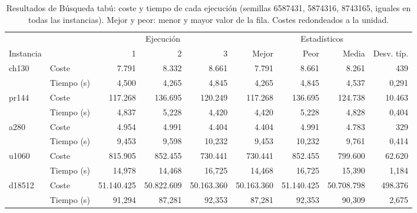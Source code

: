 \begin{table}[H]
\centering\small\setlength{\tabcolsep}{4pt}\renewcommand{\arraystretch}{1.15}
\begin{adjustbox}{max width=\textwidth}
\begin{tabular}{llrrrrrrr}
\toprule
 & & \multicolumn{3}{c}{Ejecución} & \multicolumn{4}{c}{Estadísticos} \\
\cmidrule(lr){3-5}\cmidrule(lr){6-9}
Instancia & & 1 & 2 & 3 & Mejor & Peor & Media & Desv. típ. \\
\midrule
\rowcolor{gray!10}ch130 & Coste & 7{.}791 & 8{.}332 & 8{.}661 & 7{.}791 & 8{.}661 & 8{.}261 & 439 \\
\rowcolor{gray!10} & Tiempo (s) & 4{,}500 & 4{,}265 & 4{,}845 & 4{,}265 & 4{,}845 & 4{,}537 & 0{,}291 \\
pr144 & Coste & 117{.}268 & 136{.}695 & 120{.}249 & 117{.}268 & 136{.}695 & 124{.}738 & 10{.}463 \\
 & Tiempo (s) & 4{,}837 & 5{,}228 & 4{,}420 & 4{,}420 & 5{,}228 & 4{,}828 & 0{,}404 \\
\rowcolor{gray!10}a280 & Coste & 4{.}954 & 4{.}991 & 4{.}404 & 4{.}404 & 4{.}991 & 4{.}783 & 329 \\
\rowcolor{gray!10} & Tiempo (s) & 9{,}453 & 9{,}598 & 10{,}232 & 9{,}453 & 10{,}232 & 9{,}761 & 0{,}414 \\
u1060 & Coste & 815{.}905 & 852{.}455 & 730{.}441 & 730{.}441 & 852{.}455 & 799{.}600 & 62{.}620 \\
 & Tiempo (s) & 14{,}978 & 14{,}468 & 16{,}725 & 14{,}468 & 16{,}725 & 15{,}390 & 1{,}184 \\
\rowcolor{gray!10}d18512 & Coste & 51{.}140{.}425 & 50{.}822{.}609 & 50{.}163{.}360 & 50{.}163{.}360 & 51{.}140{.}425 & 50{.}708{.}798 & 498{.}376 \\
\rowcolor{gray!10} & Tiempo (s) & 91{,}294 & 87{,}281 & 92{,}353 & 87{,}281 & 92{,}353 & 90{,}309 & 2{,}675 \\
\bottomrule
\end{tabular}
\end{adjustbox}
\caption[Resultados de Búsqueda tabú]{Resultados de Búsqueda tabú: coste y tiempo de cada ejecución (semillas 6587431, 5874316, 8743165, iguales en todas las instancias). Mejor y peor: menor y mayor valor de la fila. Costes redondeados a la unidad.}
\label{tab:tabu-res}
\end{table}
